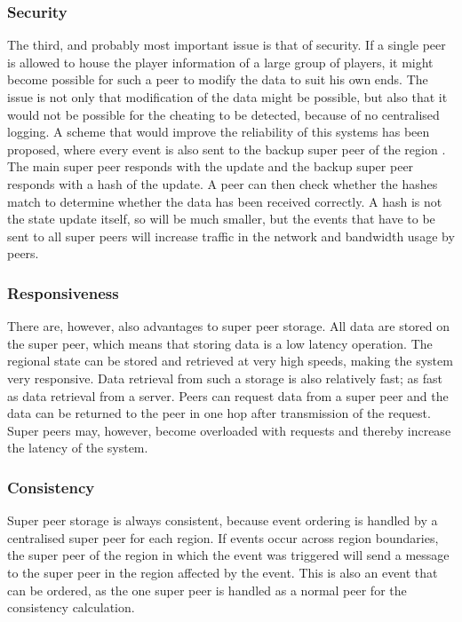\documentclass[10pt,a4paper,journal,cspaper,compsoc]{IEEEtran}
\begin{document}
\subsubsection{Security}
The third, and probably most important issue is that of security. If a single peer is allowed to house the player information of a large group of
players, it might become possible for such a peer to modify the data to suit his own ends. The issue is not only that modification of the data might
be possible, but also that it would not be possible for the cheating to be detected, because of no centralised logging. A scheme that would improve
the reliability of this systems has been proposed, where every event is also sent to the backup super peer of the region \cite{past_storage_focus}.
The main super peer responds with the update and the backup super peer responds with a hash of the update. A peer can then check whether the hashes
match to determine whether the data has been received correctly. A hash is not the state update itself, so will be much smaller, but the events that
have to be sent to all super peers will increase traffic in the network and bandwidth usage by peers.

\subsubsection{Responsiveness}
There are, however, also advantages to super peer storage. All data are stored on the super peer, which means that storing data is a low latency
operation. The regional state can be stored and retrieved at very high speeds, making the system very responsive. Data retrieval from such a storage
is also relatively fast; as fast as data retrieval from a server. Peers can request data from a super peer and the data can be returned to the peer
in one hop after transmission of the request. Super peers may, however, become overloaded with requests and thereby increase the latency of the
system.

\subsubsection{Consistency}
Super peer storage is always consistent, because event ordering is handled by a centralised super peer for each region. If events occur across region
boundaries, the super peer of the region in which the event was triggered will send a message to the super peer in the region affected by the event.
This is also an event that can be ordered, as the one super peer is handled as a normal peer for the consistency calculation.
\end{document}
